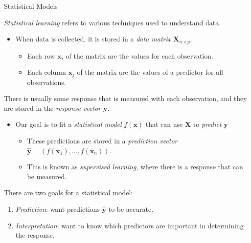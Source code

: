 \documentclass[8pt]{beamer}
\newcommand{\mydef}[1]{\textcolor{SteelBlue3}{\textit{#1}}} %
\begin{document}
\begin{frame}{Statistical Models}

\mydef{Statistical learning} refers to various techniques used to understand data. 

\begin{itemize}
    \item When data is collected, it is stored in a \mydef{data matrix} $\mathbf{X}_{n \times p}$. 
\begin{itemize}
    \item Each row $\bm{x}_i$ of the matrix are the values for each observation. 
    \item Each column $\mathbf{x}_j$ of the matrix are the values of a predictor for all observations.
\end{itemize}
\end{itemize}

There is usually some response that is measured with each observation, and they are stored in the \mydef{response vector} $\mathbf{y}$. 

\begin{itemize}
\item Our goal is to fit a \mydef{statistical model} $f(\bm{x})$ that can use $\mathbf{X}$ to \mydef{predict} $\mathbf{y}$ 

\begin{itemize}
    \item These predictions are stored in a \mydef{prediction vector} $\hat{\mathbf{y}} = (f(\bm{x}_1), \ldots, f(\bm{x}_n))$. 
    \item This is known as \mydef{supervised learning}, where there is a response that can be measured.
\end{itemize}
\end{itemize} 

There are two goals for a statistical model: 
\begin{enumerate}
    \item \mydef{Prediction}: want predictions $\hat{\mathbf{y}}$ to be accurate.
    \item \mydef{Interpretation}: want to know which predictors are important in determining the response.
\end{enumerate}
\end{frame}
\end{document}
